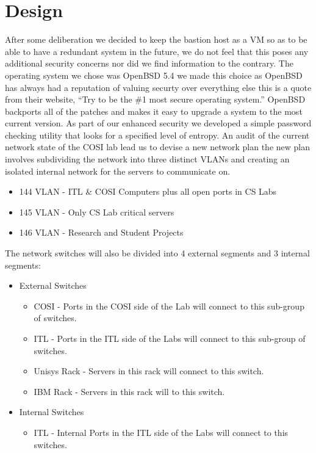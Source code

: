 \documentclass[11pt]{article}
\begin{document}
\section{Design}
\begin{paragraph}\indent
After some deliberation we decided to keep the bastion host as a VM so as to be able to have a redundant system in the future, we do not feel that this poses any additional security concerns nor did we find information to the contrary. 
The operating system we chose was OpenBSD 5.4 we made this choice as OpenBSD has always had a reputation of valuing securty over everything else this is a quote from their website, ``Try to be the \#1 most secure operating system.'' 
OpenBSD backports all of the patches and makes it easy to upgrade a system to the most current version.
As part of our enhanced security we developed a simple password checking utility that looks for a specified level of entropy.
An audit of the current network state  of the COSI lab lead us to devise a new network plan the new plan involves subdividing the network into three distinct VLANs and creating an isolated internal network for the servers to communicate on.
\begin{itemize}
	\item 144 VLAN - ITL \& COSI Computers plus all open ports in CS Labs
	\item 145 VLAN - Only CS Lab critical servers
	\item 146 VLAN - Research and Student Projects
\end{itemize}
The network switches will also be divided into 4 external segments and 3 internal segments:
\begin{itemize}
	\item External Switches
	\begin{itemize}
		\item COSI - Ports in the COSI side of the Lab will connect to this sub-group of switches.
		\item ITL  - Ports in the ITL side of the Labs will connect to this sub-group of switches.
		\item Unisys Rack - Servers in this rack will connect to this switch.
		\item IBM Rack - Servers in this rack will to this switch.
	\end{itemize}
	\item Internal Switches
	\begin{itemize}
		\item ITL  - Internal Ports in the ITL side of the Labs will connect to this switches.

\end{itemize}
\end{itemize}
\end{paragraph}
\end{document}
